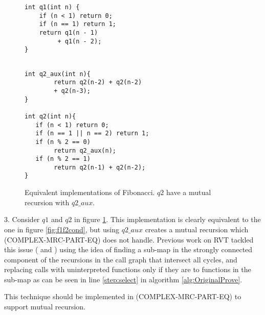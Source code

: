 \begin{figure}[h]
\begin{center}
\begin{minipage}{7 cm}
\begin{lstlisting}
int q1(int n) {
    if (n < 1) return 0;
    if (n == 1) return 1;
    return q1(n - 1) 
         + q1(n - 2);
}
\end{lstlisting}
\end{minipage}
\begin{minipage}{7 cm}
\begin{lstlisting}

int q2_aux(int n){
        return q2(n-2) + q2(n-2)
        + q2(n-3);
}

int q2(int n){
   if (n < 1) return 0;
   if (n == 1 || n == 2) return 1; 
   if (n % 2 == 0)
        return q2_aux(n);
   if (n % 2 == 1)
        return q2(n-1) + q2(n-2);
}
\end{lstlisting}
\end{minipage}
\caption{Equivalent implementations of Fibonacci. $q2$ have a mutual recursion with $q2\_aux$.}
\label{fig:mutualrecursion}
\end{center}
\end{figure}

3. Consider $q1$ and $q2$ in figure \ref{fig:mutualrecursion}. This implementation is clearly equivalent to the one in figure \ref{fig:f1f2cond}, but using $q2\_aux$ creates a mutual recursion which (COMPLEX-MRC-PART-EQ) does not handle. Previous work on RVT tackled this issue (\cite{DBLP:conf/dac/GodlinS09} and \cite{DBLP:conf/fm/StrichmanV16}) using the idea of finding a sub-map in the strongly connected component of the recursions in the call graph that intersect all cycles, and replacing calls with uninterpreted functions only if they are to functions in the sub-map as can be seen in line \ref{step:select} in algorithm \ref{alg:OriginalProve}.

This technique should be implemented in (COMPLEX-MRC-PART-EQ) to support mutual recursion.




































